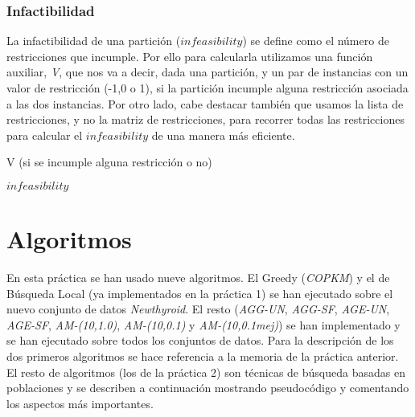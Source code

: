 \documentclass[11pt,a4paper]{article}
\begin{document}
    \subsubsection{Infactibilidad}
    La infactibilidad de una partición ($infeasibility$) se define como el número de restricciones que incumple. Por ello para calcularla utilizamos una función auxiliar, \textit{V}, que nos va a decir, dada una partición, y un par de instancias con un valor de restricción (-1,0 o 1), si la partición incumple alguna restricción asociada a las dos instancias. Por otro lado, cabe destacar también que usamos la lista de restricciones, y no la matriz de restricciones, para recorrer todas las restricciones para calcular el $infeasibility$ de una manera más eficiente.
    \begin{algorithm}
	 	\caption{V (si se incumple alguna restricción o no)}
	\end{algorithm}
	\begin{algorithm}
	 	\caption{$infeasibility$}
	\end{algorithm}
	\section{Algoritmos}
	En esta práctica se han usado nueve algoritmos. El Greedy (\textit{COPKM}) y el de Búsqueda Local (ya implementados en la práctica 1) se han ejecutado sobre el nuevo conjunto de datos \textit{Newthyroid}. El resto (\textit{AGG-UN}, \textit{AGG-SF}, \textit{AGE-UN}, \textit{AGE-SF}, \textit{AM-(10,1.0)}, \textit{AM-(10,0.1)} y \textit{AM-(10,0.1mej)}) se han implementado y se han ejecutado sobre todos los conjuntos de datos. Para la descripción de los dos primeros algoritmos se hace referencia a la memoria de la práctica anterior. El resto de algoritmos (los de la práctica 2) son técnicas de búsqueda basadas en poblaciones y se describen a continuación mostrando pseudocódigo y comentando los aspectos más importantes. 
	
\end{document}
